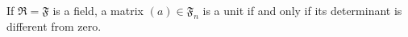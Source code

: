 If $\Re = \mathfrak{F}$ is a field, a matrix $(a) \in \mathfrak{F}_n$ is a unit if and only if its determinant is different from zero.
